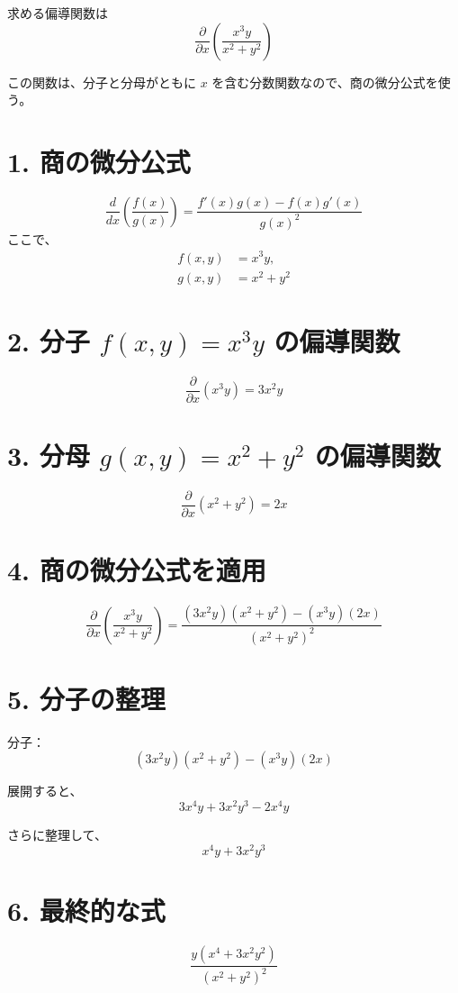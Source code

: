 \documentclass{article}
\begin{document}
求める偏導関数は
\[
\frac{\partial}{\partial x} \left( \frac{x^3 y}{x^2 + y^2} \right)
\]

この関数は、分子と分母がともに \( x \) を含む分数関数なので、商の微分公式を使う。

\section*{1. 商の微分公式}
\[
\frac{d}{dx} \left( \frac{f(x)}{g(x)} \right) = \frac{f'(x) g(x) - f(x) g'(x)}{g(x)^2}
\]
ここで、
\begin{align*}
    f(x, y) &= x^3 y, \\
    g(x, y) &= x^2 + y^2
\end{align*}

\section*{2. 分子 \( f(x, y) = x^3 y \) の偏導関数}
\[
\frac{\partial}{\partial x} (x^3 y) = 3x^2 y
\]

\section*{3. 分母 \( g(x, y) = x^2 + y^2 \) の偏導関数}
\[
\frac{\partial}{\partial x} (x^2 + y^2) = 2x
\]

\section*{4. 商の微分公式を適用}
\[
\frac{\partial}{\partial x} \left( \frac{x^3 y}{x^2 + y^2} \right)
=
\frac{(3x^2 y)(x^2 + y^2) - (x^3 y)(2x)}{(x^2 + y^2)^2}
\]

\section*{5. 分子の整理}
分子：
\[
(3x^2 y)(x^2 + y^2) - (x^3 y)(2x)
\]

展開すると、
\[
3x^4 y + 3x^2 y^3 - 2x^4 y
\]

さらに整理して、
\[
x^4 y + 3x^2 y^3
\]

\section*{6. 最終的な式}
\[
\frac{y (x^4 + 3x^2 y^2)}{(x^2 + y^2)^2}
\]
\end{document}
